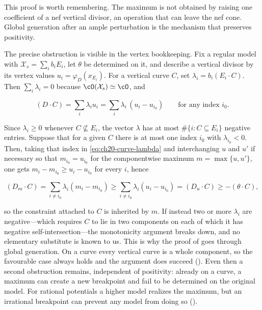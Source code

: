 \begin{remark}
\label{rem:ch20-why-max-is-hard}
This proof is worth remembering.  The maximum is not obtained by raising
one coefficient of a nef vertical divisor, an operation that can leave the
nef cone.  Global generation after an ample perturbation is the mechanism
that preserves positivity.

The precise obstruction is visible in the vertex bookkeeping.  Fix a regular
model with \(\mathcal X_s=\sum_ib_iE_i\), let \(\theta\) be determined on
it, and describe a vertical divisor by its vertex values
\(u_i=\varphi_D(x_{E_i})\).  For a vertical curve \(C\), set
\(\lambda_i=b_i(E_i\cdot C)\).  Then \(\sum_i\lambda_i=0\) because
\(\cO(\mathcal X_s)\simeq\cO\), and

\begin{equation}
\label{eq:ch20-curve-lambda}
 (D\cdot C)=\sum_i\lambda_iu_i
 =\sum_{i}\lambda_i\,(u_i-u_{i_0})
 \qquad\text{for any index }i_0 .
\end{equation}

Since \(\lambda_i\geq0\) whenever \(C\not\subseteq E_i\), the vector
\(\lambda\) has at most \(\#\{i:C\subseteq E_i\}\) negative entries.  Suppose
that for a given \(C\) there is at most one index \(i_0\) with
\(\lambda_{i_0}<0\).  Then, taking that index in
\eqref{eq:ch20-curve-lambda} and interchanging \(u\) and \(u'\) if
necessary so that \(m_{i_0}=u_{i_0}\) for the componentwise maximum
\(m=\max\{u,u'\}\), one gets \(m_i-m_{i_0}\geq u_i-u_{i_0}\) for every
\(i\), hence

\[
 (D_m\cdot C)=\sum_{i\ne i_0}\lambda_i(m_i-m_{i_0})
 \geq\sum_{i\ne i_0}\lambda_i(u_i-u_{i_0})=(D_u\cdot C)
 \geq-(\theta\cdot C),
\]

so the constraint attached to \(C\) is inherited by \(m\).  If instead two or
more \(\lambda_i\) are negative---which requires \(C\) to lie in two
components on each of which it has negative self-intersection---the
monotonicity argument breaks down, and no elementary substitute is known to
us.  This is why the proof of  goes through global
generation.  On a curve every vertical curve is a whole component, so the
favourable case always holds and the argument does succeed
().  Even then a second obstruction remains,
independent of positivity: already on a curve, a maximum can create a
new breakpoint and fail to be determined on the original model.
For rational potentials a higher model realizes the maximum, but an
irrational breakpoint can prevent any model from doing so
().
\end{remark}

